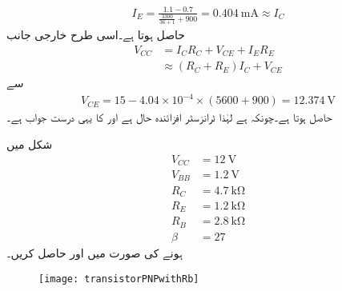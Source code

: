 \begin{align*}
I_E = \frac{1.1-0.7}{\frac{3300}{36+1}+900}=\SI{0.404}{\milli \ampere} \approx I_C
\end{align*}
حاصل ہوتا ہے۔اسی طرح خارجی جانب
\begin{align*}
V_{CC}&=I_C R_C +V_{CE}+I_E R_E\\
& \approx \left(R_C+R_E \right) I_C+V_{CE}
\end{align*}
سے
\begin{align*}
V_{CE}=15-4.04 \times 10^{-4} \times (5600+900)=\SI{12.374}{\volt}
\end{align*}
حاصل ہوتا ہے۔چونکہ  ہے لہٰذا ٹرانزسٹر افزائندہ حال ہے اور   کا یہی درست جواب ہے۔

شکل   میں
\begin{align*}
V_{CC}&=\SI{12}{\volt}\\
V_{BB}&=\SI{1.2}{\volt} \\
R_C&=\SI{4.7}{\kilo \ohm} \\
R_E&=\SI{1.2}{\kilo \ohm}\\
R_B &=\SI{2.8}{\kilo \ohm}\\
\beta &=27
\end{align*}
ہونے کی صورت میں  اور  حاصل کریں۔
\begin{figure}
\centering
\texttt{[image: transistorPNPwithRb]}
\caption{}
\label{شکل_تینوں_سروں_پر_مزاحمت_ب}
\end{figure}


